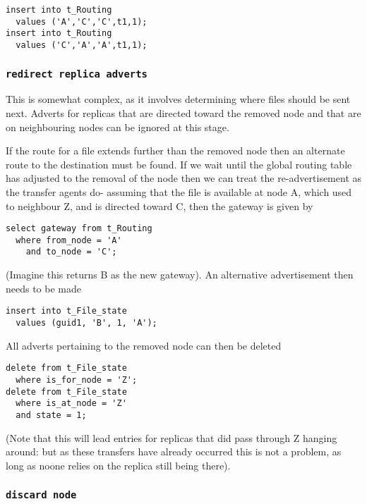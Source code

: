 \documentclass{cmspaper}
\begin{document}
{\small\begin{verbatim}
insert into t_Routing
  values ('A','C','C',t1,1);
insert into t_Routing
  values ('C','A','A',t1,1);
\end{verbatim}}

\subsubsection{\textbf{\texttt{redirect replica adverts}}}
This is somewhat complex, as it involves determining where files should be sent next. Adverts for replicas that are directed toward the removed node and that are on neighbouring nodes can be ignored at this stage. 

If the route for a file extends further than the removed node then an alternate route to the destination must be found. If we wait until the global routing table has adjusted to the removal of the node then we can treat the re-advertisement as the transfer agents do- assuming that the file is available at node A, which used to neighbour Z, and is directed toward C, then the gateway is given by

{\small\begin{verbatim}
select gateway from t_Routing
  where from_node = 'A'
    and to_node = 'C';
\end{verbatim}}

(Imagine this returns B as the new gateway). An alternative advertisement then needs to be made

{\small\begin{verbatim}
insert into t_File_state
  values (guid1, 'B', 1, 'A');
\end{verbatim}}

All adverts pertaining to the removed node can then be deleted

{\small\begin{verbatim}
delete from t_File_state
  where is_for_node = 'Z';
delete from t_File_state
  where is_at_node = 'Z'
  and state = 1;
\end{verbatim}}

(Note that this will lead entries for replicas that did pass through Z hanging around: but as these transfers have already occurred this is not a problem, as long as noone relies on the replica still being there).

\subsubsection{\textbf{\texttt{discard node}}}
\end{document}
